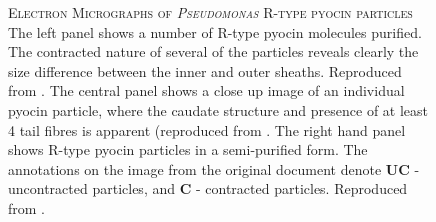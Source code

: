 \vspace{0.2cm}
\begin{figure}[h]
\centering
    \begin{subfigure}[b]{0.4\textwidth}
        \centering
        {%
\setlength{\fboxsep}{0pt}%
\setlength{\fboxrule}{1pt}%
            }%
    \end{subfigure}%
        \begin{subfigure}[t]{0.18\textwidth}
        \centering
        {%
\setlength{\fboxsep}{0pt}%
\setlength{\fboxrule}{1pt}%
        }%
    \end{subfigure}%
    \begin{subfigure}[t]{0.4\textwidth}
        \centering
        {%
\setlength{\fboxsep}{0pt}%
\setlength{\fboxrule}{1pt}%
        }%
        \end{subfigure}%
	\captionsetup{singlelinecheck=off, justification=justified, font=footnotesize, aboveskip=10pt}
	\caption[Electron micrographs of \emph{Pseudomonas} R-type pyocins]{\textsc{\normalsize Electron Micrographs of \emph{Pseudomonas} R-type pyocin particles}\vspace{0.1cm} \newline The left panel shows a number of R-type pyocin molecules purified. The contracted nature of several of the particles reveals clearly the size difference between the inner and outer sheaths. Reproduced from \cite{Lee1999}. The central panel shows a close up image of an individual pyocin particle, where the caudate structure and presence of at least 4 tail fibres is apparent (reproduced from \cite{Williams2008a}. The right hand panel shows R-type pyocin particles in a semi-purified form. The annotations on the image from the original document denote \textbf{UC} - uncontracted particles, and \textbf{C} - contracted particles. Reproduced from \cite{Morse1976}.}
	\label{pyocinems}
\end{figure}



